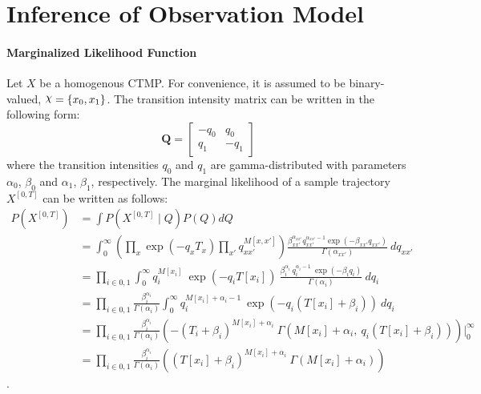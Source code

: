 \section{Inference of Observation Model}

\paragraph{Marginalized Likelihood Function} 
Let $ X $ be a homogenous CTMP. For convenience, it is assumed to be binary-valued, $ \rchi = \left\lbrace x_{0}, x_{1} \right\rbrace $. The transition intensity matrix can be written in the following form:
\begin{equation}
\textbf{Q} = 
\begin{bmatrix}
-q_{0} & q_{0} \\
q_{1} & -q_{1}
\end{bmatrix}
\end{equation}
where the transition intensities $ q_{0} $ and $ q_{1} $ are gamma-distributed with parameters $ \alpha_{0}$, $ \beta_{0} $ and $ \alpha_{1} $, $ \beta_{1} $, respectively. The marginal likelihood of a sample trajectory $ X^{[0,T]} $ can be written as follows:
\begin{align}
P(X^{[0, T]}) & = \int  P(X^{[0, T]}\mid Q)P(Q) dQ \nonumber\\ & = \int_{0}^{\infty} \left( \prod_{x} \exp(-q_{x}T_{x}) \prod_{x'} q_{xx'}^{M[x, x']}\right) \frac{\beta_{xx'}^{\alpha_{xx'}}{q_{xx'}^{\alpha_{xx'}-1}}\exp(-\beta_{xx'}q_{xx'})}{\Gamma(\alpha_{xx'})} \ dq_{xx'} \nonumber\\ & = \prod_{i\in{0,1}}\int_{0}^{\infty} q_{i}^{M[x_{i}]} \ \exp(-q_{i}T[x_{i}]) \  \frac{\beta_{i}^{\alpha_{i}} \ q_{i}^{\alpha_{i}-1}\ \exp(-\beta_{i}q_{i})}{\Gamma(\alpha_{i})} \ dq_{i} \nonumber\\ & = \prod_{i\in{0,1}} \frac{\beta_{i}^{\alpha_{i}}}{\Gamma(\alpha_{i})} \int_{0}^{\infty} q_{i}^{M[x_{i}] + \alpha_{i} -1} \ \exp(-q_{i}(T[x_{i}]+\beta_{i})) \ dq_{i} \\ & = \prod_{i\in{0,1}} \frac{\beta_{i}^{\alpha_{i}}}{\Gamma(\alpha_{i})} \left( -(T_{i}+\beta_{i})^{M[x_{i}] + \alpha_{i}}\ \Gamma(M[x_{i}] + \alpha_{i}, \ q_{i}(T[x_{i}]+\beta_{i})) \right) \Big|_0^\infty  \\ & = \prod_{i\in{0,1}} \frac{\beta_{i}^{\alpha_{i}}}{\Gamma(\alpha_{i})} \left( (T[x_{i}]+\beta_{i})^{M[x_{i}] + \alpha_{i}}\ \Gamma(M[x_{i}] + \alpha_{i}) \right)
\label{eq:Marg_traj}
\end{align}.

